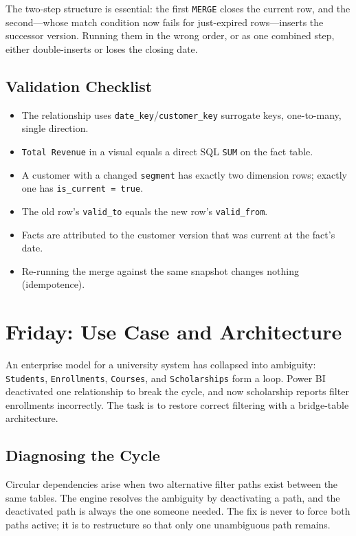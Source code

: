The two-step structure is essential: the first \texttt{MERGE} closes the current row, and the second---whose match condition now fails for just-expired rows---inserts the successor version. Running them in the wrong order, or as one combined step, either double-inserts or loses the closing date.

\subsection{Validation Checklist}
\begin{itemize}
    \item The relationship uses \texttt{date\_key}/\texttt{customer\_key} surrogate keys, one-to-many, single direction.
    \item \texttt{Total Revenue} in a visual equals a direct SQL \texttt{SUM} on the fact table.
    \item A customer with a changed \texttt{segment} has exactly two dimension rows; exactly one has \texttt{is\_current = true}.
    \item The old row's \texttt{valid\_to} equals the new row's \texttt{valid\_from}.
    \item Facts are attributed to the customer version that was current at the fact's date.
    \item Re-running the merge against the same snapshot changes nothing (idempotence).
\end{itemize}

\section{Friday: Use Case and Architecture}
An enterprise model for a university system has collapsed into ambiguity: \texttt{Students}, \texttt{Enrollments}, \texttt{Courses}, and \texttt{Scholarships} form a loop. Power BI deactivated one relationship to break the cycle, and now scholarship reports filter enrollments incorrectly. The task is to restore correct filtering with a bridge-table architecture.

\subsection{Diagnosing the Cycle}
Circular dependencies arise when two alternative filter paths exist between the same tables. The engine resolves the ambiguity by deactivating a path, and the deactivated path is always the one someone needed. The fix is never to force both paths active; it is to restructure so that only one unambiguous path remains.

